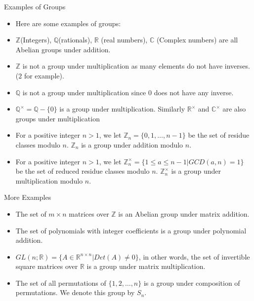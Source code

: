 \documentclass[ %
 10pt, xcolor={dvipsnames,svgnames,x11names,hyperref},
   hyperref={colorlinks=true,citecolor=green,linkcolor=DarkRed,urlcolor=ProcessBlue,anchorcolor=blue}
  ]{beamer}
\newenvironment{stepitemize}{\begin{itemize}[<+->]}{\end{itemize} }
\newcommand{\Z}{\mathbb{Z}}
\newcommand{\Q}{\mathbb{Q}}
\newcommand{\R}{\mathbb{R}}
\newcommand{\C}{\mathbb{C}}
\begin{document}
\begin{frame}{Examples of Groups}
\begin{stepitemize}
\item Here are some examples of groups:
\item $\Z$(Integers), $\Q$(rationals), $\R$ (real numbers), $\C$ (Complex numbers) are all Abelian groups under addition.
    \item $\Z$ is not a group under multiplication as many elements do not have inverses. ($2$ for example).
    \item $\Q$ is not a group under multiplication since $0$ does not have any inverse.
    \item $\Q^{\times} = \Q-\{0\}$ is a group under multiplication. Similarly $\R^{\times}$ and $\C^{\times}$ are also groups under multiplication
    \item For a positive integer $n>1$, we let $\Z_n = \{0,1, \dots, n-1\}$ be the set of residue classes modulo $n$. $\Z_n$ is a group under addition modulo $n$. 
    \item For a positive integer $n>1$, we let $\Z_n^{\times} = \{1\leq a \leq n-1|GCD(a,n)=1\}$ be the set of reduced residue classes modulo $n$. $\Z_n^{\times}$ is a group under multiplication modulo $n$. 
    
\end{stepitemize}
\end{frame}
\begin{frame}{More Examples}
  \begin{stepitemize}
    \item The set of $m\times n$ matrices over $\Z$ is an Abelian group under matrix addition. 
    \item The set of polynomials with integer coefficients is a group under polynomial addition. 
    \item $GL(n;\R) = \{A\in \R^{n\times n}|Det(A) \neq 0\}$, in other words, the set of invertible square matrices over $\R$ is a group under matrix multiplication. 
    \item The set of all permutations of $\{1,2, \dots, n\}$ is a group under composition of permutations. We denote this group by $S_n$.  

\end{stepitemize}
\end{frame}
\end{document}

